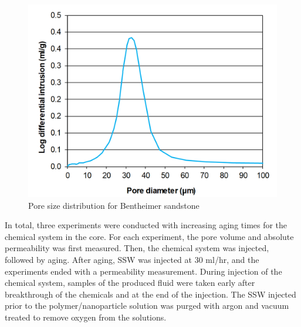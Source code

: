 \documentclass[journal = enfuem, manuscript =  article]{achemso}
\begin{document}
\begin{figure}
    \centering
    \includegraphics[width=.7\textwidth]{fig/poreSizeDist.png}
    \caption{Pore size distribution for Bentheimer sandstone}
    \label{cht:poreSizeDist}
\end{figure}

In total, three experiments were conducted with increasing aging times for the chemical system in the core. For each experiment, the pore volume and absolute permeability was first measured. Then, the chemical system was injected, followed by aging. After aging, SSW was injected at 30 ml/hr, and the experiments ended with a permeability measurement. During injection of the chemical system, samples of the produced fluid were taken early after breakthrough of the chemicals and at the end of the injection.
The SSW injected prior to the polymer/nanoparticle solution was purged with argon and vacuum treated to remove oxygen from the solutions.


\end{document}
